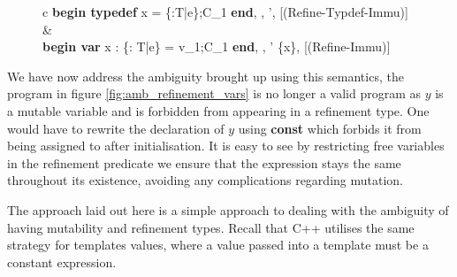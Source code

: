 \documentclass[a4paper,12pt]{report}
\begin{document}
\begin{figure}[h]
  \begin{center}
    \begin{tabular}{c}
      {\langle \textbf{begin typedef } x = \{\upsilon :T\text{ }|\text{ }e\};C_1\textbf{ end}, 
      \sigma, \tau \rangle \longrightarrow 
        \langle \sigma', \tau \rangle} [(Refine-Typdef-Immu)]
      & \\
      {\langle\textbf{begin var }x : \{\upsilon : T\text{ }|\text{ }e\} = v_1;C_1 \textbf{ end}, \sigma, \tau \rangle 
      \longrightarrow \langle \sigma' \setminus \{x\}, \tau \rangle} [(Refine-Immu)]
    \end{tabular}
  \end{center}
\end{figure}

\par
We have now address the ambiguity brought up using this semantics, 
the program in figure \ref{fig:amb_refinement_vars} is no longer a valid program as 
$y$ is a mutable variable and is forbidden from appearing in a refinement type. 
One would have to rewrite the declaration of $y$ using \textbf{const} which 
forbids it from being assigned to after initialisation. 
It is easy to see by restricting free variables in the refinement predicate we ensure 
that the expression stays the same throughout its existence, avoiding any 
complications regarding mutation.

\par
The approach laid out here is a simple approach to dealing with the ambiguity of 
having mutability and refinement types. Recall that C++ utilises the same 
strategy for templates values, where a value passed into a template must be a 
constant expression. 
\end{document}
